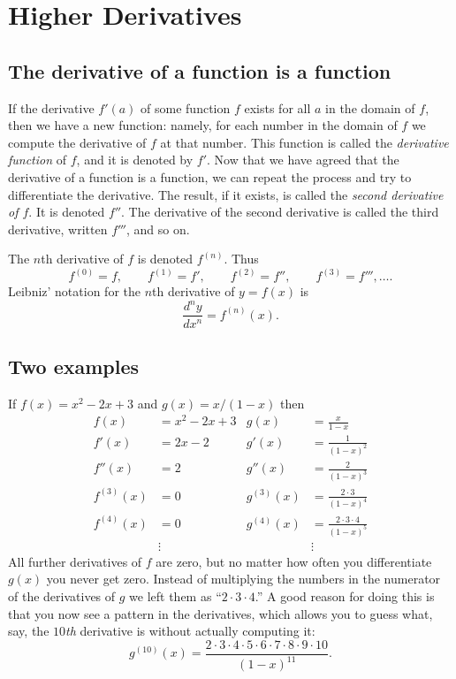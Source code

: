 \noproblemfont
\section{Higher Derivatives}

\subsection{The derivative of a function is a function}
If the derivative $f'(a)$ of some function $f$ exists for all $a$ in the domain
of $f$, then we have a new function: namely, for each number in the domain of
$f$ we compute the derivative of $f$ at that number.  This function is called
the \emph{derivative function} of $f$, and it is denoted by $f'$.  Now that we
have agreed that the derivative of a function is a function, we can repeat the
process and try to differentiate the derivative.  The result, if it exists, is
called the \emph{second derivative of $f$}.  It is denoted $f''$.  The
derivative of the second derivative is called the third derivative, written
$f'''$, and so on.

The $n$th derivative of $f$ is denoted $f^{(n)}$.  Thus
\[
f^{(0)}=f,\qquad f^{(1)}=f',\qquad f^{(2)}=f'',\qquad
f^{(3)}=f''',\ldots.
\]
Leibniz' notation for the $n$th derivative of $y=f(x)$ is
\[
\frac{d^ny}{dx^n}= f^{(n)}(x).
\]


\subsection{Two examples}
If $f(x) = x^2-2x+3$ and $g(x) = x/(1-x)$ then
\begin{align*}
  f(x) &= x^2 - 2x + 3  & g(x)&= \frac{x} {1-x} \\
  f'(x) &= 2x -2 & g'(x) &= \frac{1} {(1-x)^2} \\
  f''(x) &= 2 & g''(x) &= \frac{2} {(1-x)^3} \\
  f^{(3)}(x) &= 0 & g^{(3)}(x) &= \frac{2\cdot 3} {(1-x)^4}\\
  f^{(4)}(x) &= 0 & g^{(4)}(x) &= \frac{2\cdot3\cdot4} {(1-x)^5}\\
  &\vdots &&\vdots
\end{align*}
All further derivatives of $f$ are zero, but no matter how often you
differentiate $g(x)$ you never get zero.  Instead of multiplying the
numbers in the numerator of the derivatives of $g$ we left them as
``$2\cdot3\cdot4$.''  A good reason for doing this is that you now see
a pattern in the derivatives, which allows you to guess what, say, the
$10$\textit{th} derivative is without actually computing it:
\[
g^{(10)}(x) =
\frac{2\cdot3\cdot4\cdot5\cdot6\cdot7\cdot8\cdot9\cdot10} {(1-x)^{11}}.
\]


